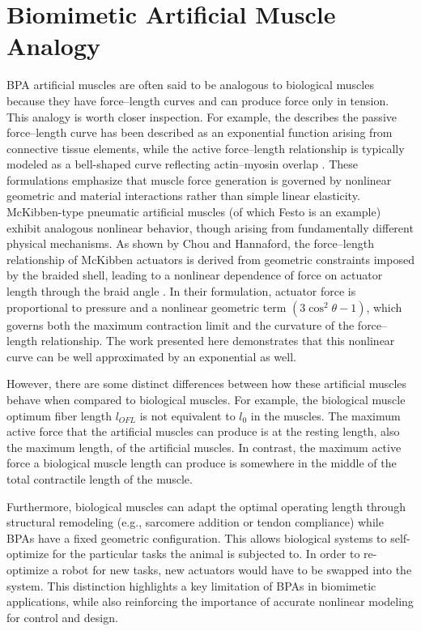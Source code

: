 \section{Biomimetic Artificial Muscle Analogy}\label{sec:disc_bio}

BPA artificial muscles are often said to be analogous to biological muscles because they have force--length curves and can produce force only in tension. This analogy is worth closer inspection. For example, the describes the passive force–length curve has been described as an exponential function arising from connective tissue elements, while the active force–length relationship is typically modeled as a bell-shaped curve reflecting actin–myosin overlap \citep{winters1990}. These formulations emphasize that muscle force generation is governed by nonlinear geometric and material interactions rather than simple linear elasticity.
McKibben-type pneumatic artificial muscles (of which Festo is an example) exhibit analogous nonlinear behavior, though arising from fundamentally different physical mechanisms. As shown by Chou and Hannaford, the force–length relationship of McKibben actuators is derived from geometric constraints imposed by the braided shell, leading to a nonlinear dependence of force on actuator length through the braid angle \cite{chou_measurement_1996}. In their formulation, actuator force is proportional to pressure and a nonlinear geometric term $(3\cos^2\theta - 1)$, which governs both the maximum contraction limit and the curvature of the force–length relationship. The work presented here demonstrates that this nonlinear curve can be well approximated by an exponential as well.

However, there are some distinct differences between how these artificial muscles behave when compared to biological muscles.
For example, the biological muscle optimum fiber length $l_{OFL}$ is not equivalent to $l_0$ in the muscles. The maximum active force that the artificial muscles can produce is at the resting length, also the maximum length, of the artificial muscles. In contrast, the maximum active force a biological muscle length can produce is somewhere in the middle of the total contractile length of the muscle. 

Furthermore, biological muscles can adapt the optimal operating length through structural remodeling (e.g., sarcomere addition or tendon compliance) while BPAs have a fixed geometric configuration. This allows biological systems to self-optimize for the particular tasks the animal is subjected to. In order to re-optimize a robot for new tasks, new actuators would have to be swapped into the system. This distinction highlights a key limitation of BPAs in biomimetic applications, while also reinforcing the importance of accurate nonlinear modeling for control and design.




